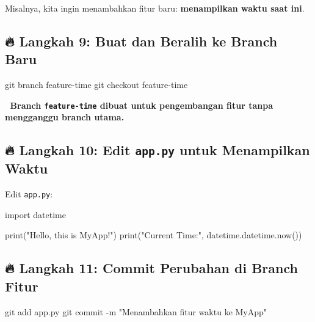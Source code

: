 \documentclass[
  letterpaper,
  DIV=11,
  numbers=noendperiod]{scrreprt}
\newenvironment{Shaded}{\begin{snugshade}}{\end{snugshade}}
\newcommand{\AttributeTok}[1]{\textcolor[rgb]{0.40,0.45,0.13}{#1}}
\newcommand{\BuiltInTok}[1]{\textcolor[rgb]{0.00,0.23,0.31}{#1}}
\newcommand{\FunctionTok}[1]{\textcolor[rgb]{0.28,0.35,0.67}{#1}}
\newcommand{\ImportTok}[1]{\textcolor[rgb]{0.00,0.46,0.62}{#1}}
\newcommand{\NormalTok}[1]{\textcolor[rgb]{0.00,0.23,0.31}{#1}}
\newcommand{\StringTok}[1]{\textcolor[rgb]{0.13,0.47,0.30}{#1}}
\begin{document}
Misalnya, kita ingin menambahkan fitur baru: \textbf{menampilkan waktu
saat ini}.

\subsection{\texorpdfstring{🔥 \textbf{Langkah 9: Buat dan Beralih ke
Branch
Baru}}{🔥 Langkah 9: Buat dan Beralih ke Branch Baru}}\label{langkah-9-buat-dan-beralih-ke-branch-baru}

\begin{Shaded}
\begin{Highlighting}[]
\FunctionTok{git}\NormalTok{ branch feature{-}time}
\FunctionTok{git}\NormalTok{ checkout feature{-}time}
\end{Highlighting}
\end{Shaded}

📌 \textbf{Branch \texttt{feature-time} dibuat untuk pengembangan fitur
tanpa mengganggu branch utama.}

\subsection{\texorpdfstring{🔥 \textbf{Langkah 10: Edit \texttt{app.py}
untuk Menampilkan
Waktu}}{🔥 Langkah 10: Edit app.py untuk Menampilkan Waktu}}\label{langkah-10-edit-app.py-untuk-menampilkan-waktu}

Edit \texttt{app.py}:

\begin{Shaded}
\begin{Highlighting}[]
\ImportTok{import}\NormalTok{ datetime}

\BuiltInTok{print}\NormalTok{(}\StringTok{"Hello, this is MyApp!"}\NormalTok{)}
\BuiltInTok{print}\NormalTok{(}\StringTok{"Current Time:"}\NormalTok{, datetime.datetime.now())}
\end{Highlighting}
\end{Shaded}

\subsection{\texorpdfstring{🔥 \textbf{Langkah 11: Commit Perubahan di
Branch
Fitur}}{🔥 Langkah 11: Commit Perubahan di Branch Fitur}}\label{langkah-11-commit-perubahan-di-branch-fitur}

\begin{Shaded}
\begin{Highlighting}[]
\FunctionTok{git}\NormalTok{ add app.py}
\FunctionTok{git}\NormalTok{ commit }\AttributeTok{{-}m} \StringTok{"Menambahkan fitur waktu ke MyApp"}
\end{Highlighting}
\end{Shaded}
\end{document}
